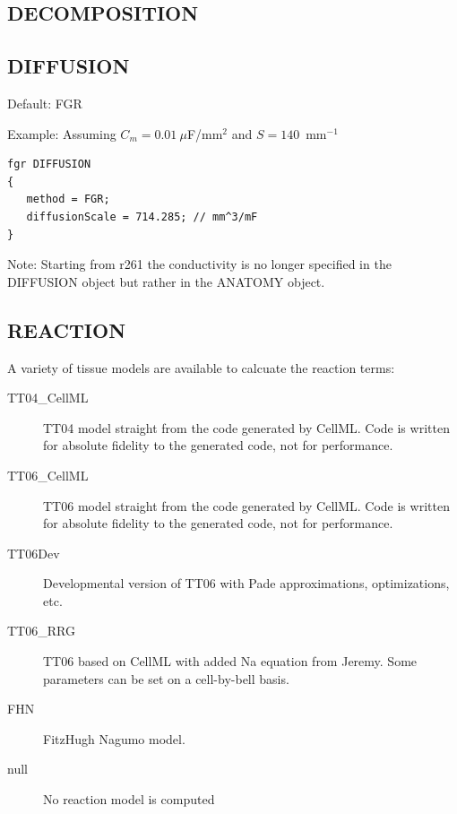 \documentclass{article}
\begin{document}
\subsection{DECOMPOSITION}
\begin{keywords}
\end{keywords}

\subsection{DIFFUSION}

\begin{keywords}
  {Default: FGR}
\end{keywords}


Example:
Assuming $C_m = 0.01~\mu$F/mm$^2$ and $S=140$~mm$^{-1}$
\begin{verbatim}
fgr DIFFUSION
{
   method = FGR;
   diffusionScale = 714.285; // mm^3/mF
}
\end{verbatim}

Note: Starting from r261 the conductivity is no longer specified in the
DIFFUSION object but rather in the ANATOMY object.

\subsection{REACTION}
A variety of tissue models are available to calcuate the reaction terms:

\begin{description}
  \item[TT04\_CellML] TT04 model straight from the code generated by
    CellML.  Code is written for absolute fidelity to the generated
    code, not for performance.
  \item[TT06\_CellML] TT06 model straight from the code generated by
    CellML.  Code is written for absolute fidelity to the generated
    code, not for performance.
  \item[TT06Dev] Developmental version of TT06 with Pade approximations,
    optimizations, etc.
  \item[TT06\_RRG] TT06 based on CellML with added Na equation from
    Jeremy.  Some parameters can be set on a cell-by-bell basis.
  \item[FHN] FitzHugh Nagumo model.
  \item[null] No reaction model is computed
\end{description}
\end{document}
